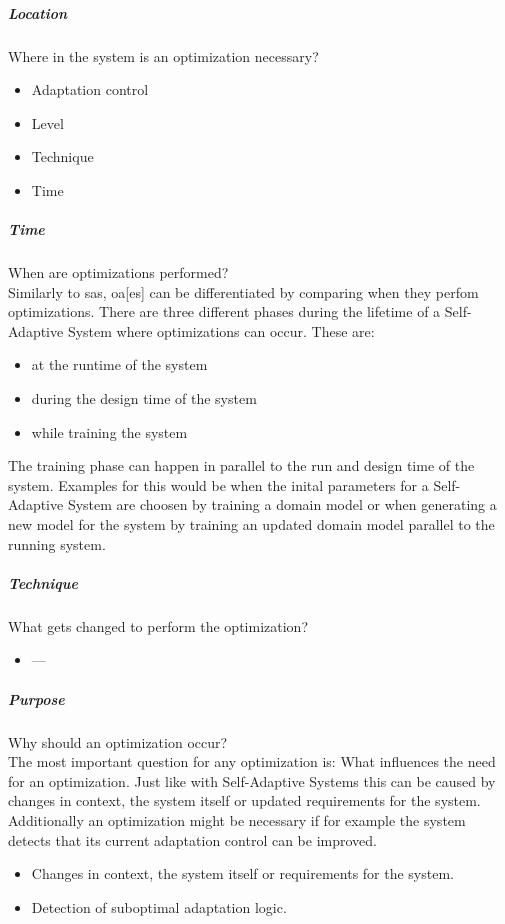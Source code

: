 \subparagraph*{Location}
Where in the system is an optimization necessary? \\

\begin{itemize}
    \item Adaptation control
    \item Level
    \item Technique
    \item Time
\end{itemize}

\subparagraph*{Time}
When are optimizations performed? \\
Similarly to \acrshort{sas}, \acrlong{oa}[es] can be differentiated by comparing when they perfom optimizations.
There are three different phases during the lifetime of a Self-Adaptive System where optimizations can occur.
These are:
\begin{itemize}
    \item at the runtime of the system
    \item during the design time of the system
    \item while training the system
\end{itemize}
The training phase can happen in parallel to the run and design time of the system.
Examples for this would be when the inital parameters for a Self-Adaptive System are choosen by training a domain model
or when generating a new model for the system by training an updated domain model parallel to the running system.

\subparagraph*{Technique}
What gets changed to perform the optimization? \\
\begin{itemize}
    \item ---
\end{itemize}

\subparagraph*{Purpose}
Why should an optimization occur? \\
The most important question for any optimization is: What influences the need for an optimization.
Just like with Self-Adaptive Systems this can be caused by changes in context, the system itself or updated requirements for the system.
Additionally an optimization might be necessary if for example the system detects that its current adaptation control can be improved.

\begin{itemize}
    \item Changes in context, the system itself or requirements for the system.
    \item Detection of suboptimal adaptation logic.
\end{itemize}

